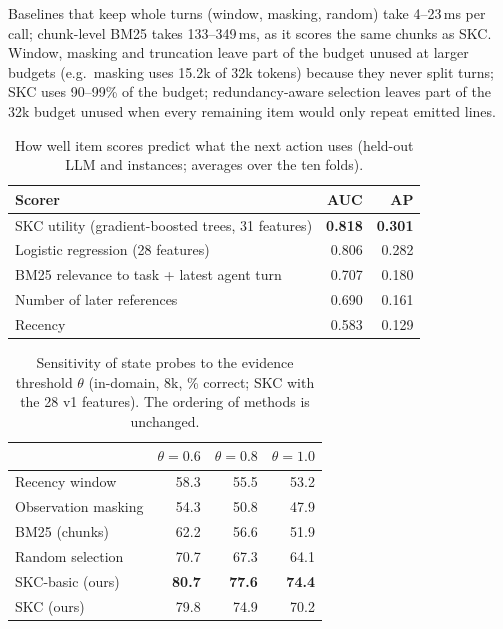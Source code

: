 Baselines that keep whole turns (window, masking, random) take 4--23\,ms per
call; chunk-level BM25 takes 133--349\,ms, as it scores the same chunks as SKC.
Window, masking and truncation leave part of the budget unused at larger budgets
(e.g.\ masking uses 15.2k of 32k tokens) because they never split turns; SKC
uses 90--99\% of the budget; redundancy-aware selection leaves part of the 32k
budget unused when every remaining item would only repeat emitted lines.

\begin{table}[h]
\centering
\small
\caption{How well item scores predict what the next action uses (held-out LLM
and instances; averages over the ten folds).}
\label{tab:auc}
\begin{tabular}{l rr}
\toprule
Scorer & AUC & AP \\
\midrule
SKC utility (gradient-boosted trees, 31 features) & \textbf{0.818} & \textbf{0.301} \\
Logistic regression (28 features) & 0.806 & 0.282 \\
BM25 relevance to task + latest agent turn & 0.707 & 0.180 \\
Number of later references & 0.690 & 0.161 \\
Recency & 0.583 & 0.129 \\
\bottomrule
\end{tabular}
\end{table}

\begin{table}[h]
\centering
\small
\caption{Sensitivity of state probes to the evidence threshold $\theta$
(in-domain, 8k, \% correct; SKC with the 28 v1 features). The ordering of
methods is unchanged.}
\label{tab:theta}
\begin{tabular}{l rrr}
\toprule
 & $\theta=0.6$ & $\theta=0.8$ & $\theta=1.0$ \\
\midrule
Recency window & 58.3 & 55.5 & 53.2 \\
Observation masking & 54.3 & 50.8 & 47.9 \\
BM25 (chunks) & 62.2 & 56.6 & 51.9 \\
Random selection & 70.7 & 67.3 & 64.1 \\
SKC-basic (ours) & \textbf{80.7} & \textbf{77.6} & \textbf{74.4} \\
SKC (ours) & 79.8 & 74.9 & 70.2 \\
\bottomrule
\end{tabular}
\end{table}


